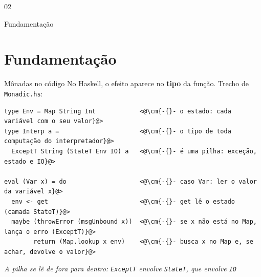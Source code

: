 \documentclass[aspectratio=169,10pt,xcolor={table}]{beamer}
\newcommand{\legenda}[1]{\par\vskip1.5mm{\centering\footnotesize\itshape\color{corpo!85}#1\par}}
\newcommand{\cm}[1]{\textcolor{comentario}{\itshape #1}}
\newcommand{\transicao}[2]{%
  \begin{frame}[plain]
    \centering\vfill
    {\fontsize{13}{15}\selectfont\color{secao}#1\par}\vskip3mm
    {\titulofonte\fontsize{24}{28}\selectfont\color{texto}#2\par}
    \vfill
  \end{frame}}
\begin{document}
\transicao{02}{Fundamentação}
\section{Fundamentação}

\begin{frame}[fragile]{Mônadas no código}
  No Haskell, o efeito aparece no \textbf{tipo} da função. Trecho de \texttt{Monadic.hs}:
  \vskip3mm
\begin{lstlisting}[language=HaskellTCC]
type Env = Map String Int            <@\cm{-{}- o estado: cada variável com o seu valor}@>
type Interp a =                      <@\cm{-{}- o tipo de toda computação do interpretador}@>
  ExceptT String (StateT Env IO) a   <@\cm{-{}- é uma pilha: exceção, estado e IO}@>

eval (Var x) = do                    <@\cm{-{}- caso Var: ler o valor da variável x}@>
  env <- get                         <@\cm{-{}- get lê o estado (camada StateT)}@>
  maybe (throwError (msgUnbound x))  <@\cm{-{}- se x não está no Map, lança o erro (ExceptT)}@>
        return (Map.lookup x env)    <@\cm{-{}- busca x no Map e, se achar, devolve o valor}@>
\end{lstlisting}
  \legenda{A pilha se lê de fora para dentro: \texttt{ExceptT} envolve \texttt{StateT}, que envolve \texttt{IO}}
\end{frame}
\end{document}
